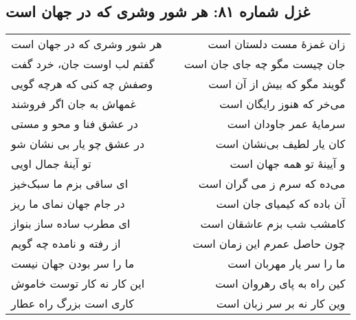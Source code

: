 \begin{center}
\section*{غزل شماره ۸۱: هر شور وشری که در جهان است}
\label{sec:081}
\begin{longtable}{l p{0.5cm} r}
هر شور وشری که در جهان است
&&
زان غمزهٔ مست دلستان است
\\
گفتم لب اوست جان، خرد گفت
&&
جان چیست مگو چه جای جان است
\\
وصفش چه کنی که هرچه گویی
&&
گویند مگو که بیش از آن است
\\
غمهاش به جان اگر فروشند
&&
می‌خر که هنوز رایگان است
\\
در عشق فنا و محو و مستی
&&
سرمایهٔ عمر جاودان است
\\
در عشق چو یار بی نشان شو
&&
کان یار لطیف بی‌نشان است
\\
تو آینهٔ جمال اویی
&&
و آیینهٔ تو همه جهان است
\\
ای ساقی بزم ما سبک‌خیز
&&
می‌ده که سرم ز می گران است
\\
در جام جهان نمای ما ریز
&&
آن باده که کیمیای جان است
\\
ای مطرب ساده ساز بنواز
&&
کامشب شب بزم عاشقان است
\\
از رفته و نامده چه گویم
&&
چون حاصل عمرم این زمان است
\\
ما را سر بودن جهان نیست
&&
ما را سر یار مهربان است
\\
این کار نه کار توست خاموش
&&
کین راه به پای رهروان است
\\
کاری است بزرگ راه عطار
&&
وین کار نه بر سر زبان است
\\
\end{longtable}
\end{center}
